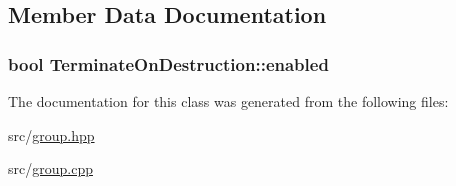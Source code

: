 \subsection{Member Data Documentation}
\hypertarget{class_terminate_on_destruction_a17854fe56e131d017df98b77f9c4cbfc}{
\subsubsection[{enabled}]{\setlength{\rightskip}{0pt plus 5cm}bool Terminate\-On\-Destruction\-::enabled\hspace{0.3cm}{\ttfamily [private]}}}\label{class_terminate_on_destruction_a17854fe56e131d017df98b77f9c4cbfc}


The documentation for this class was generated from the following files\-:\begin{DoxyCompactItemize}
\item 
src/\hyperlink{group_8hpp}{group.\-hpp}\item 
src/\hyperlink{group_8cpp}{group.\-cpp}\end{DoxyCompactItemize}
